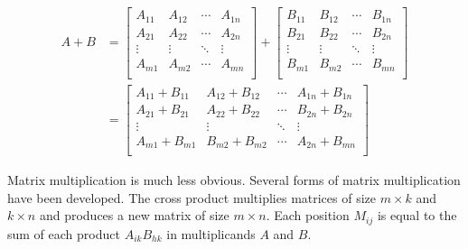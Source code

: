 \documentclass{book}
\begin{document}
\begin{equation}
\begin{split}
A+B
&
=
\begin{bmatrix}
A_{11} & A_{12} & \cdots & A_{1n} \\
A_{21} & A_{22} & \cdots & A_{2n} \\
\vdots & \vdots & \ddots & \vdots \\
A_{m1} & A_{m2} & \cdots & A_{mn} \\
\end{bmatrix} +
\begin{bmatrix}
B_{11} & B_{12} & \cdots & B_{1n} \\
B_{21} & B_{22} & \cdots & B_{2n} \\
\vdots & \vdots & \ddots & \vdots \\
B_{m1} & B_{m2} & \cdots & B_{mn} \\
\end{bmatrix} \\
&
=
\begin{bmatrix}
A_{11} + B_{11} & A_{12} + B_{12} & \cdots & A_{1n} + B_{1n} \\
A_{21} + B_{21} & A_{22} + B_{22} & \cdots & B_{2n} + B_{2n} \\
\vdots & \vdots & \ddots & \vdots \\
A_{m1} + B_{m1} & B_{m2} + B_{m2} & \cdots & A_{2n} + B_{mn} \\
\end{bmatrix}
\end{split}
\end{equation}

Matrix multiplication is much less obvious. Several forms of matrix multiplication have been developed. The cross product multiplies matrices of size $m \times k$ and $k \times n$ and produces a new matrix of size $m \times n$. Each position $M_{ij}$ is equal to the sum of each product $A_{ik}B_{hk}$ in multiplicands $A$ and $B$.
\end{document}
